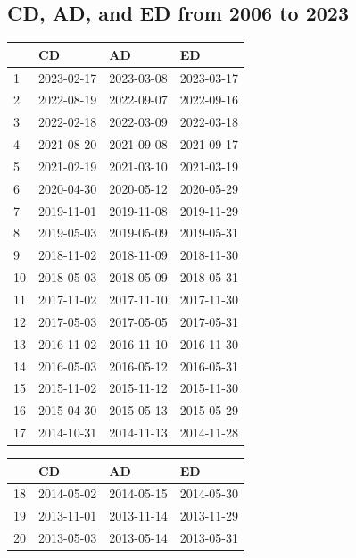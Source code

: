 \begin{appendices}
\section{CD, AD, and ED from 2006 to 2023}
\label{APPENDIX CD, AD, and ED from 2006 to 2023}
\begin{table}[H]
\centering
\vspace{1em}
\label{CD-AD-ED-2006-2023}
\begin{minipage}{.5\textwidth}
\centering
\begin{tabular}{llll}
\hline
 & CD & AD & ED \\ 
\hline
1 & 2023-02-17 & 2023-03-08 & 2023-03-17 \\ 
2 & 2022-08-19 & 2022-09-07 & 2022-09-16 \\ 
3 & 2022-02-18 & 2022-03-09 & 2022-03-18 \\ 
4 & 2021-08-20 & 2021-09-08 & 2021-09-17 \\ 
5 & 2021-02-19 & 2021-03-10 & 2021-03-19 \\ 
6 & 2020-04-30 & 2020-05-12 & 2020-05-29 \\ 
7 & 2019-11-01 & 2019-11-08 & 2019-11-29 \\ 
8 & 2019-05-03 & 2019-05-09 & 2019-05-31 \\ 
9 & 2018-11-02 & 2018-11-09 & 2018-11-30 \\ 
10 & 2018-05-03 & 2018-05-09 & 2018-05-31 \\ 
11 & 2017-11-02 & 2017-11-10 & 2017-11-30 \\ 
12 & 2017-05-03 & 2017-05-05 & 2017-05-31 \\ 
13 & 2016-11-02 & 2016-11-10 & 2016-11-30 \\ 
14 & 2016-05-03 & 2016-05-12 & 2016-05-31 \\ 
15 & 2015-11-02 & 2015-11-12 & 2015-11-30 \\ 
16 & 2015-04-30 & 2015-05-13 & 2015-05-29 \\ 
17 & 2014-10-31 & 2014-11-13 & 2014-11-28 \\ 
\hline
\end{tabular}
\end{minipage}%
\begin{minipage}{.5\textwidth}
\centering
\begin{tabular}{llll}
\hline
 & CD & AD & ED \\ 
\hline 
18 & 2014-05-02 & 2014-05-15 & 2014-05-30 \\ 
19 & 2013-11-01 & 2013-11-14 & 2013-11-29 \\ 
20 & 2013-05-03 & 2013-05-14 & 2013-05-31 \\ 

\end{tabular}
\end{minipage}
\end{table}
\end{appendices}

